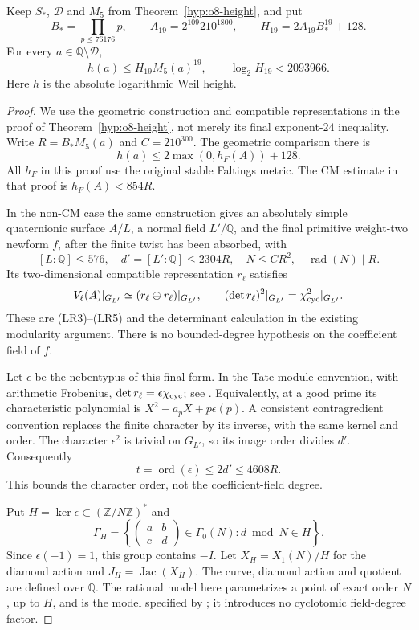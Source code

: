 \begin{theorem}\label{thm:quartic-height19}
Keep $S_*$, $\mathcal D$ and $M_5$ from Theorem~\ref{hyp:o8-height}, and put
\[
 B_*=\prod_{p\le76176}p,\qquad
 A_{19}=2^{109}210^{1800},\qquad H_{19}=2A_{19}B_*^{19}+128.
\]
For every $a\in\mathbb Q\setminus\mathcal D$,
\[
 h(a)\le H_{19}M_5(a)^{19},
 \qquad \log_2H_{19}<2093966.
\]
Here $h$ is the absolute logarithmic Weil height.
\end{theorem}
\begin{proof}
We use the geometric construction and compatible representations in the
proof of Theorem~\ref{hyp:o8-height}, not merely its final exponent-$24$
inequality. Write $R=B_*M_5(a)$ and $C=210^{300}$.
The geometric comparison there is
\[
 h(a)\le2\max(0,h_F(A))+128.
\]
All $h_F$ in this proof use the original stable Faltings metric.
The CM estimate in that proof is $h_F(A)<854R$.

In the non-CM case the same construction gives an absolutely simple
quaternionic surface $A/L$, a normal field $L'/\mathbb Q$, and the final
primitive weight-two newform $f$, after the finite twist has been
absorbed, with
\[
 [L:\mathbb Q]\le576,\quad d'=[L':\mathbb Q]\le2304R,\quad
 N\le CR^2,\quad \operatorname{rad}(N)\mid R.
\]
Its two-dimensional compatible representation $r_\ell$ satisfies
\[
 V_\ell(A)|_{G_{L'}}\simeq
       (r_\ell\oplus r_\ell)|_{G_{L'}},\qquad
 (\det r_\ell)^2|_{G_{L'}}=\chi_{\rm cyc}^2|_{G_{L'}}.
\]
These are (LR3)--(LR5) and the determinant calculation in the existing
modularity argument. There is no bounded-degree hypothesis on the
coefficient field of $f$.

Let $\epsilon$ be the nebentypus of this final form. In the Tate-module
convention, with arithmetic Frobenius, $\det r_\ell=\epsilon\chi_{\rm cyc}$;
see \cite[\S12.5, (12.5.1)--(12.5.2) and Remark 12.5.1,
pp.~119--120]{diamond-im}. Equivalently, at a good prime its
characteristic polynomial is $X^2-a_pX+p\epsilon(p)$.
A consistent contragredient convention replaces the finite character by
its inverse, with the same kernel and order. The character $\epsilon^2$
is trivial on $G_{L'}$, so its image order divides $d'$. Consequently
\[
 t=\operatorname{ord}(\epsilon)\le2d'\le4608R.
\]
This bounds the character order, not the coefficient-field degree.

Put $H=\ker\epsilon\subset(\mathbb Z/N\mathbb Z)^*$ and
\[
 \Gamma_H=\left\{
 \begin{pmatrix}a&b\\c&d\end{pmatrix}\in\Gamma_0(N):
 d\bmod N\in H\right\}.
\]
Since $\epsilon(-1)=1$, this group contains $-I$.
Let $X_H=X_1(N)/H$ for the diamond action and $J_H=\operatorname{Jac}(X_H)$.
The curve, diamond action and quotient are defined over $\mathbb Q$.
The rational model here parametrizes a point of exact order $N$, up to
$H$, and is the model specified by \cite[\S2.1, (2.1.8)]{mascot-moduli};
it introduces no cyclotomic field-degree factor.


\end{proof}

